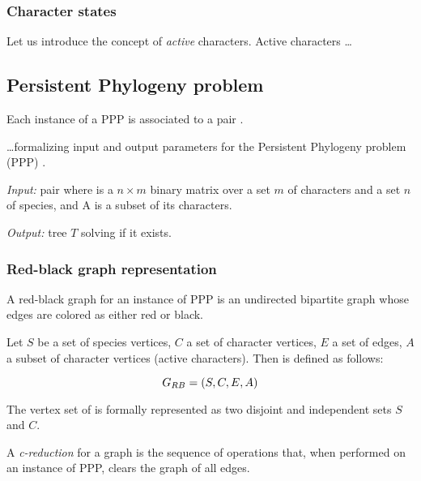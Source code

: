 \subsubsection{Character states}\label{sssec:charstates}


Let us introduce the concept of \textit{active} characters.
Active characters  \dots

\subsection{Persistent Phylogeny problem}\label{ssec:ppp}


Each instance of a PPP is associated to a pair \ma{}.

 \dots formalizing input and output parameters for the Persistent Phylogeny problem (PPP) \cite{Bonizzoni2016SolvingTP}.

\begin{definition}\label{def:ppp}
  \text{}

  \textit{Input:} pair \ma{} where \m{} is a $n \times m$ binary matrix over a set $m$ of characters and a set $n$ of species, and A is a subset of its characters.

  \textit{Output:} tree $T$ solving \m{} if it exists.
\end{definition}

\subsubsection{Red-black graph representation}\label{sssec:grb}

A red-black graph for an instance of PPP is an undirected bipartite graph whose edges are colored as either red or black.

\begin{definition}\label{def:grb}
  Let $S$ be a set of species vertices, $C$ a set of character vertices, $E$ a set of edges, $A$ a subset of character vertices (active characters).
  Then \grb{} is defined as follows:

  \[ G_{RB}{} = (S, C, E, A) \]

  The vertex set of \grb{} is formally represented as two disjoint and independent sets $S$ and $C$.
\end{definition}


A \textit{c-reduction} for a graph \grb{} is the sequence of operations that, when performed on an instance of PPP, clears the graph of all edges.
